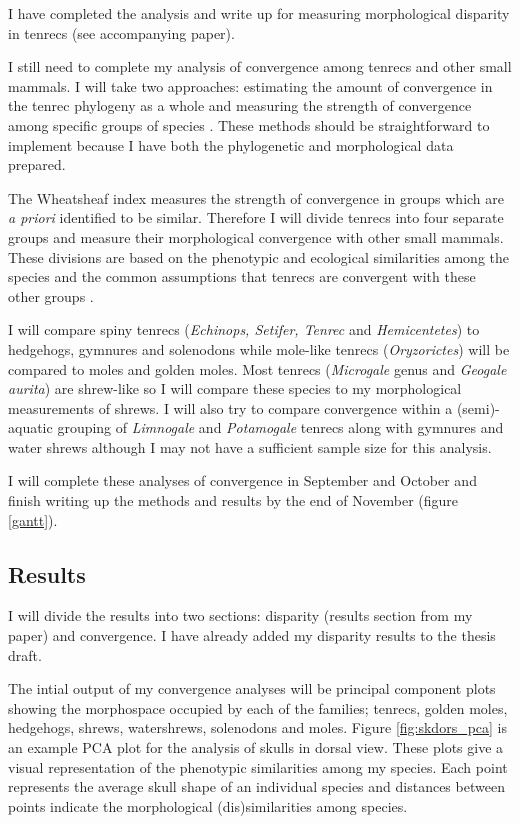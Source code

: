 \documentclass[12pt,a4paper]{article}
\begin{document}
	I have completed the analysis and write up for measuring morphological disparity in tenrecs (see accompanying paper).
	
	I still need to complete my analysis of convergence among tenrecs and other small mammals. I will take two approaches: estimating the amount of convergence in the tenrec phylogeny as a whole \citep{Stayton2008} and measuring the strength of convergence among specific groups of species \citep{Arbuckle2014}. These methods should be straightforward to implement because I have both the phylogenetic and morphological data prepared. 
	
	The Wheatsheaf index \citep{Arbuckle2014} measures the strength of convergence in groups which are \textit{a priori} identified to be similar. Therefore I will divide tenrecs into four separate groups and measure their morphological convergence with other small mammals. These divisions are based on the phenotypic and ecological similarities among the species and the common assumptions that tenrecs are convergent with these other groups \citep[e.g.][]{Soarimalala2011, Olson2013}. 
	
	I will compare spiny tenrecs (\textit{Echinops, Setifer, Tenrec} and \textit{Hemicentetes}) to hedgehogs, gymnures and solenodons while mole-like tenrecs (\textit{Oryzorictes}) will be compared to moles and golden moles. Most tenrecs (\textit{Microgale} genus and \textit{Geogale aurita}) are shrew-like so I will compare these species to my morphological measurements of shrews. I will also try to compare convergence within a (semi)-aquatic grouping of \textit{Limnogale} and \textit{Potamogale} tenrecs along with gymnures and water shrews although I may not have a sufficient sample size for this analysis. 
		
	I will complete these analyses of convergence in September and October and finish writing up the methods and results by the end of November (figure \ref{gantt}).

 
\subsection{Results}
	
	I will divide the results into two sections: disparity (results section from my paper) and convergence. I have already added my disparity results to the thesis draft.
	
	The intial output of my convergence analyses will be principal component plots showing the morphospace occupied by each of the families; tenrecs, golden moles, hedgehogs, shrews, watershrews, solenodons and moles. Figure \ref{fig:skdors_pca} is an example PCA plot for the analysis of skulls in dorsal view. These plots give a visual representation of the phenotypic similarities among my species. Each point represents the average skull shape of an individual species and distances between points indicate the morphological (dis)similarities among species.
	
\end{document}
